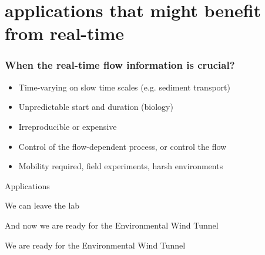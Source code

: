 %
% 
%
%
%
%
%

% 

\section{applications that might benefit from real-time}

\begin{frame}[label=app-110b]
\frametitle{When the real-time flow information is crucial?}
\begin{itemize}
	\item Time-varying on slow time scales (e.g. sediment transport)
    \item Unpredictable start and duration (biology) 
    \item Irreproducible or expensive %
	\item Control of the flow-dependent process, or control the flow %
    \item Mobility required, field experiments, harsh environments
\end{itemize}
\end{frame}

\begin{frame}[label=app-0]{Applications}
\centering{}
\end{frame}

\begin{frame}[label=app-112]{We can leave the lab}
\begin{multicols}{2}
\end{multicols}
\end{frame}


\begin{frame}[label=iibr-4]{And now we are ready for the Environmental Wind Tunnel}
\end{frame}
    
\begin{frame}[label=iibr-44]{We are ready for the Environmental Wind Tunnel}
  \centering{}
\end{frame}
    
